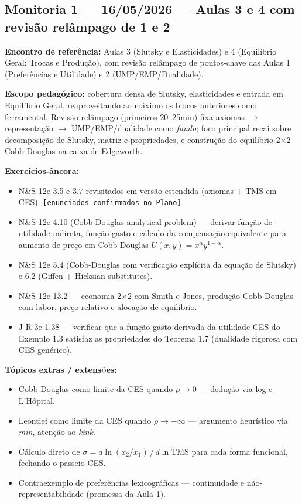 \documentclass[11pt,a4paper]{article}
\newcommand{\ns}{N\&S 12e}
\newcommand{\jr}{J-R 3e}
\begin{document}
\subsection{Monitoria 1 --- 16/05/2026 --- Aulas 3 e 4 com revisão relâmpago de 1 e 2}

\textbf{Encontro de referência:} Aulas 3 (Slutsky e Elasticidades) e 4 (Equilíbrio Geral: Trocas e Produção), com revisão relâmpago de pontos-chave das Aulas 1 (Preferências e Utilidade) e 2 (UMP/EMP/Dualidade).

\textbf{Escopo pedagógico:} cobertura densa de Slutsky, elasticidades e entrada em Equilíbrio Geral, reaproveitando ao máximo os blocos anteriores como ferramental. Revisão relâmpago (primeiros 20--25min) fixa axiomas $\to$ representação $\to$ UMP/EMP/dualidade como \emph{fundo}; foco principal recai sobre decomposição de Slutsky, matriz e propriedades, e construção do equilíbrio 2$\times$2 Cobb-Douglas na caixa de Edgeworth.

\textbf{Exercícios-âncora:}
\begin{itemize}
  \item \ns{} 3.5 e 3.7 revisitados em versão estendida (axiomas + TMS em CES). \texttt{[enunciados confirmados no Plano]}
  \item \ns{} 4.10 (Cobb-Douglas analytical problem) --- derivar função de utilidade indireta, função gasto e cálculo da compensação equivalente para aumento de preço em Cobb-Douglas $U(x,y) = x^\alpha y^{1-\alpha}$.
  \item \ns{} 5.4 (Cobb-Douglas com verificação explícita da equação de Slutsky) e 6.2 (Giffen + Hicksian substitutes).
  \item \ns{} 13.2 --- economia 2$\times$2 com Smith e Jones, produção Cobb-Douglas com labor, preço relativo e alocação de equilíbrio.
  \item \jr{} 1.38 --- verificar que a função gasto derivada da utilidade CES do Exemplo 1.3 satisfaz as propriedades do Teorema 1.7 (dualidade rigorosa com CES genérico).
\end{itemize}

\textbf{Tópicos extras / extensões:}
\begin{itemize}
  \item Cobb-Douglas como limite da CES quando $\rho \to 0$ --- dedução via log e L'Hôpital.
  \item Leontief como limite da CES quando $\rho \to -\infty$ --- argumento heurístico via \textit{min}, atenção ao \textit{kink}.
  \item Cálculo direto de $\sigma = d\ln(x_2/x_1)\,/\,d\ln \text{TMS}$ para cada forma funcional, fechando o passeio CES.
  \item Contraexemplo de preferências lexicográficas --- continuidade e não-representabilidade (promessa da Aula 1).
\end{itemize}
\end{document}

